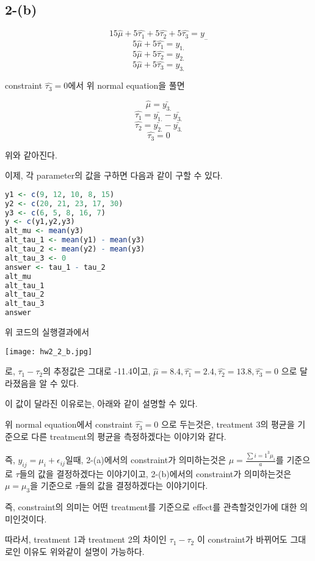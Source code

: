\documentclass{article}
\begin{document}
\subsection{2-(b)}

$$15 \hat{\mu} + 5 \hat{\tau_1} + 5 \hat{\tau_2} + 5 \hat{\tau_3} = y_{..}$$
$$5 \hat{\mu} + 5 \hat{\tau_1} = y_{1.}$$
$$5 \hat{\mu} + 5 \hat{\tau_2} = y_{2.}$$
$$5 \hat{\mu} + 5 \hat{\tau_3} = y_{3.}$$

constraint $\hat{\tau_3}=0$에서 위 normal equation을 풀면

$$\hat{\mu} =  \bar{y_{3.}}$$
$$\hat{\tau_1} = \bar{y_{1.}} - \bar{y_{3.}}$$
$$\hat{\tau_2} = \bar{y_{2.}} - \bar{y_{3.}}$$
$$\hat{\tau_3} = 0$$

위와 같아진다. 

이제, 각 parameter의 값을 구하면 다음과 같이 구할 수 있다.

\begin{lstlisting}[language=R]
y1 <- c(9, 12, 10, 8, 15)
y2 <- c(20, 21, 23, 17, 30)
y3 <- c(6, 5, 8, 16, 7)
y <- c(y1,y2,y3)
alt_mu <- mean(y3)
alt_tau_1 <- mean(y1) - mean(y3)
alt_tau_2 <- mean(y2) - mean(y3)
alt_tau_3 <- 0
answer <- tau_1 - tau_2
alt_mu
alt_tau_1
alt_tau_2
alt_tau_3
answer
\end{lstlisting}

위 코드의 실행결과에서

\begin{center}
    \texttt{[image: hw2\_2\_b.jpg]}
\end{center} 
로, $\tau_1 - \tau_2$의 추정값은 그대로 -11.4이고, 
$\hat{\mu} = 8.4, \hat{\tau_1} = 2.4, \hat{\tau_2} = 13.8, \hat{\tau_3} = 0$ 으로 달라졌음을 알 수 있다.

이 값이 달라진 이유로는, 아래와 같이 설명할 수 있다.

위 normal equation에서 constraint $\hat{\tau_3}=0$ 으로 두는것은, treatment 3의 평균을 기준으로 다른 treatment의 평균을 측정하겠다는 이야기와 같다.

즉, $y_{ij} = \mu_i + \epsilon_{ij}$일때, 2-(a)에서의 constraint가 의미하는것은 $\mu = \frac{\sum {i=1}^{3} \mu_i}{a}$를 기준으로 $\tau$들의 값을 결정하겠다는 이야기이고, 2-(b)에서의 constraint가 의미하는것은 $\mu = \mu_3$을 기준으로 
$\tau$들의  값을 결정하겠다는 이야기이다.

즉, constraint의 의미는 어떤 treatment를 기준으로 effect를 관측할것인가에 대한 의미인것이다.

따라서, treatment 1과 treatment 2의 차이인 $\tau_1 - \tau_2$ 이 constraint가 바뀌어도 그대로인 이유도 위와같이 설명이 가능하다.
\end{document}
